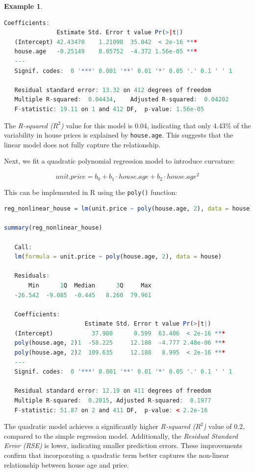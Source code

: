 \documentclass[
  11pt,
]{book}
\newcommand{\passthrough}[1]{#1}
\theoremstyle{definition}
\theoremstyle{definition}
\newtheorem{example}{Example}[chapter]
\theoremstyle{definition}
\theoremstyle{definition}
\theoremstyle{remark}
\begin{document}
\begin{example}
\begin{lstlisting}[language=R]
   Coefficients:
               Estimate Std. Error t value Pr(>|t|)    
   (Intercept) 42.43470    1.21098  35.042  < 2e-16 ***
   house.age   -0.25149    0.05752  -4.372 1.56e-05 ***
   ---
   Signif. codes:  0 '***' 0.001 '**' 0.01 '*' 0.05 '.' 0.1 ' ' 1
   
   Residual standard error: 13.32 on 412 degrees of freedom
   Multiple R-squared:  0.04434,    Adjusted R-squared:  0.04202 
   F-statistic: 19.11 on 1 and 412 DF,  p-value: 1.56e-05
\end{lstlisting}

The \emph{R-squared (\(R^2\))} value for this model is 0.04, indicating that only 4.43\% of the variability in house prices is explained by \passthrough{\lstinline!house.age!}. This suggests that the linear model does not fully capture the relationship.

Next, we fit a quadratic polynomial regression model to introduce curvature:

\[
unit.price = b_0 + b_1 \cdot house.age + b_2 \cdot house.age^2
\]

This can be implemented in R using the \passthrough{\lstinline!poly()!} function:

\begin{lstlisting}[language=R]
reg_nonlinear_house = lm(unit.price ~ poly(house.age, 2), data = house)

summary(reg_nonlinear_house)
   
   Call:
   lm(formula = unit.price ~ poly(house.age, 2), data = house)
   
   Residuals:
       Min      1Q  Median      3Q     Max 
   -26.542  -9.085  -0.445   8.260  79.961 
   
   Coefficients:
                       Estimate Std. Error t value Pr(>|t|)    
   (Intercept)           37.980      0.599  63.406  < 2e-16 ***
   poly(house.age, 2)1  -58.225     12.188  -4.777 2.48e-06 ***
   poly(house.age, 2)2  109.635     12.188   8.995  < 2e-16 ***
   ---
   Signif. codes:  0 '***' 0.001 '**' 0.01 '*' 0.05 '.' 0.1 ' ' 1
   
   Residual standard error: 12.19 on 411 degrees of freedom
   Multiple R-squared:  0.2015, Adjusted R-squared:  0.1977 
   F-statistic: 51.87 on 2 and 411 DF,  p-value: < 2.2e-16
\end{lstlisting}

The quadratic model achieves a significantly higher \emph{R-squared (\(R^2\))} value of 0.2, compared to the simple regression model. Additionally, the \emph{Residual Standard Error (RSE)} is lower, indicating smaller prediction errors. These improvements confirm that incorporating a quadratic term better captures the non-linear relationship between house age and price.
\end{example}
\end{document}

